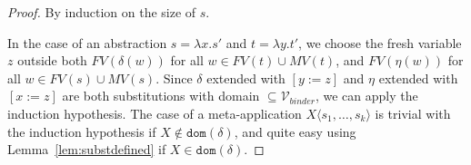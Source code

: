 \documentclass{lmcs}
\theoremstyle{theorem}\newtheorem{theorem}{Theorem}
\theoremstyle{theorem}\newtheorem{lemma}[theorem]{Lemma}
\theoremstyle{theorem}\newtheorem{corollary}[theorem]{Corollary}
\theoremstyle{definition}\newtheorem{definition}[theorem]{Definition}
\theoremstyle{definition}\newtheorem{example}[theorem]{Example}
\newcommand{\V}{\mathcal{V}}
\newcommand{\Vfree}{\mathcal{V}_{\mathit{nonb}}}
\newcommand{\Vbound}{\mathcal{V}_{\mathit{binder}}}
\newcommand{\FV}{\mathit{FV}}
\newcommand{\FMV}{\mathit{MV}}
\newcommand{\domain}{\mathtt{dom}}
\newcommand{\identifier}[1]{\mathtt{#1}}
\newcommand{\afun}{\identifier{f}}
\newcommand{\avar}{x}
\newcommand{\bvar}{y}
\newcommand{\cvar}{z}
\newcommand{\Avar}{X}
\newcommand{\abs}[2]{\lambda #1.#2}
\newcommand{\meta}[2]{#1\langle#2\rangle}
\newcommand{\tuple}[2]{\llparenthesis #1,\dots,#2 \rrparenthesis}
\begin{document}
\begin{proof}
By induction on the size of $s$.

In the case of an abstraction $s = \abs{\avar}{s'}$ and $t = \abs{\bvar}{t'}$,
we choose the fresh variable $\cvar$ outside both $\FV(\delta(w))$ for all $w
\in \FV(t) \cup \FMV(t)$, and $\FV(\eta(w))$ for all $w \in \FV(s) \cup
\FMV(s)$.  Since $\delta$ extended with $[\bvar:=\cvar]$ and $\eta$ extended
with $[\avar:=\cvar]$ are both substitutions with domain $\subseteq \Vbound$,
we can apply the induction hypothesis.  The case of a meta-application
$\meta{\Avar}{s_1,\dots,s_k}$ is trivial with the induction hypothesis if
$\Avar \notin \domain(\delta)$, and quite easy using
Lemma~\ref{lem:substdefined} if $\Avar \in \domain(\delta)$.

\end{proof}
\end{document}
